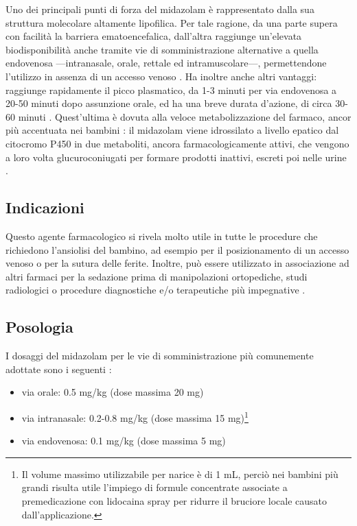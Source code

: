 Uno dei principali punti di forza del midazolam è rappresentato dalla sua struttura molecolare altamente lipofilica. Per tale ragione, da una parte supera con facilità la barriera ematoencefalica, dall'altra raggiunge un'elevata biodisponibilità anche tramite vie di somministrazione alternative a quella endovenosa ---intranasale, orale, rettale ed intramuscolare---, permettendone l'utilizzo in assenza di un accesso venoso \cite{Krauss2006}. Ha inoltre anche altri vantaggi: raggiunge rapidamente il picco plasmatico, da 1-3 minuti per via endovenosa a 20-50 minuti dopo assunzione orale, ed ha una breve durata d'azione, di circa 30-60 minuti \cite{Simeupsedazione, Uptodatepharmacology}. 
Quest'ultima è dovuta alla veloce metabolizzazione del farmaco, ancor più accentuata nei bambini \cite{Payne1989}: il midazolam viene idrossilato a livello epatico dal citocromo P450 in due metaboliti, ancora farmacologicamente attivi, che vengono a loro volta glucuroconiugati per formare prodotti inattivi, escreti poi nelle urine \cite{Olkkola2008}. 

\subsection*{Indicazioni}

Questo agente farmacologico si rivela molto utile in tutte le procedure che richiedono l'ansiolisi del bambino, ad esempio per il posizionamento di un accesso venoso o per la sutura delle ferite. Inoltre, può essere utilizzato in associazione ad altri farmaci per la sedazione prima di manipolazioni ortopediche, studi radiologici o procedure diagnostiche e/o terapeutiche più impegnative \cite{Simeupsedazione, Olkkola2008}. 

\subsection*{Posologia}

I dosaggi del midazolam per le vie di somministrazione più comunemente adottate sono i seguenti \cite{Simeupsedazione}: 
\begin{itemize}
    \item via orale: 0.5 mg/kg (dose massima 20 mg)
    \item via intranasale: 0.2-0.8 mg/kg (dose massima 15 mg)\footnote{Il volume massimo utilizzabile per narice è di 1 mL, perciò nei bambini più grandi risulta utile l'impiego di formule concentrate associate a premedicazione con lidocaina spray per ridurre il bruciore locale causato dall'applicazione.}
    \item via endovenosa: 0.1 mg/kg (dose massima 5 mg)
\end{itemize}

